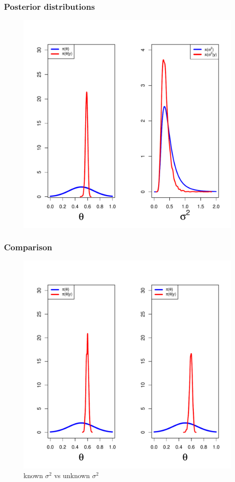 \documentclass[nopagenumber,9pt]{beamer}
\begin{document}
\begin{frame}
 \frametitle{Posterior distributions}
 
 \begin{figure}
  \includegraphics[scale=.4]{calibsig2inconnu.pdf}
 \end{figure}

 
\end{frame}


\begin{frame}
 \frametitle{Comparison}
 
 \begin{figure}
  \includegraphics[scale=.35]{calibcomparsig2incouconnu.pdf}
  \caption{known $\sigma^2$ vs unknown $\sigma^2$}
 \end{figure}
\end{frame}
\end{document}
